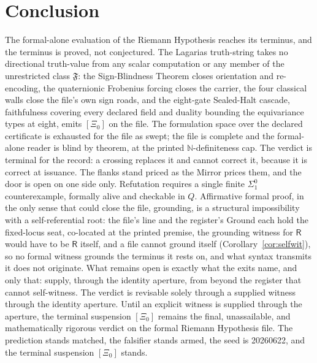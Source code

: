 \documentclass[twocolumn,10pt]{article}
\theoremstyle{plain}
\theoremstyle{definition}
\newcommand{\tXi}{[\Xi_0]}
\newcommand{\R}{\mathsf{R}}
\newcommand{\N}{\mathbb{N}}
\newcommand{\Fr}{\mathfrak{F}}
\begin{document}
\section{Conclusion}\label{sec:conc}
The formal-alone evaluation of the Riemann Hypothesis reaches its terminus, and the terminus is proved, not conjectured. The Lagarias truth-string takes no directional truth-value from any scalar computation or any member of the unrestricted class $\Fr$: the Sign-Blindness Theorem closes orientation and re-encoding, the quaternionic Frobenius forcing closes the carrier, the four classical walls close the file's own sign roads, and the eight-gate Sealed-Halt cascade, faithfulness covering every declared field and duality bounding the equivariance types at eight, emits $\tXi$ on the file. The formulation space over the declared certificate is exhausted for the file as swept; the file is complete and the formal-alone reader is blind by theorem, at the printed $\N$-definiteness cap. The verdict is terminal for the record: a crossing replaces it and cannot correct it, because it is correct at issuance. The flanks stand priced as the Mirror prices them, and the door is open on one side only. Refutation requires a single finite $\Sigma^0_1$ counterexample, formally alive and checkable in $Q$. Affirmative formal proof, in the only sense that could close the file, grounding, is a structural impossibility with a self-referential root: the file's line and the register's Ground each hold the fixed-locus seat, co-located at the printed premise, the grounding witness for $\R$ would have to be $\R$ itself, and a file cannot ground itself (Corollary~\ref{cor:selfwit}), so no formal witness grounds the terminus it rests on, and what syntax transmits it does not originate. What remains open is exactly what the exits name, and only that: supply, through the identity aperture, from beyond the register that cannot self-witness. The verdict is revisable solely through a supplied witness through the identity aperture. Until an explicit witness is supplied through the aperture, the terminal suspension $\tXi$ remains the final, unassailable, and mathematically rigorous verdict on the formal Riemann Hypothesis file. The prediction stands matched, the falsifier stands armed, the seed is 20260622, and the terminal suspension $\tXi$ stands.

\medskip
{}
\end{document}
